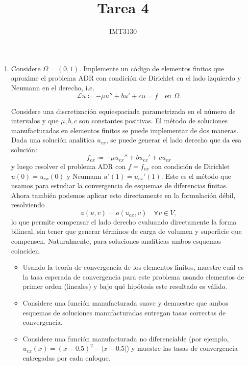 \documentclass{article}
\title{Tarea 4}
\author{}
\date{IMT3130}
\begin{document}
\maketitle

\instruccion

\begin{enumerate}
    \item Considere $\Omega = (0,1)$. Implemente un código de elementos finitos que aproxime el problema ADR con condición de Dirichlet en el lado izquierdo y Neumann en el derecho, i.e.
        $$ \mathcal L u \coloneqq -\mu u'' + b u' + c u = f \quad \text{en $\Omega$}.$$

        Considere una discretización equiespaciada parametrizada en el número de intervalos y que $\mu, b, c$ son constantes positivas. El método de soluciones manufacturadas en elementos finitos se puede implementar de dos maneras. Dada una solución analítica $u_{ex}$, se puede generar el lado derecho que da esa solución: 
            $$ f_{ex} \coloneqq -\mu u_{ex}'' + b u_{ex}' + c u_{ex} $$
            y luego resolver el problema ADR con $f = f_{ex}$ con condición de Dirichlet $u(0)=u_{ex}(0)$ y Neumann $u'(1) = u_{ex}'(1)$. Este es el método que usamos para estudiar la convergencia de esquemas de diferencias finitas. Ahora también podemos aplicar esto directamente en la formulación débil, resolviendo 
            $$ a(u,v) = a(u_{ex}, v) \quad \forall v \in V,$$
                lo que permite compensar el lado derecho evaluando directamente la forma bilineal, sin tener que generar términos de carga de volumen y superficie que compensen. Naturalmente, para soluciones analíticas ambos esquemas coinciden.

        \begin{itemize}
            \item{} Usando la teoría de convergencia de los elementos finitos, muestre cuál es la tasa esperada de convergencia para este problema usando elementos de primer orden (lineales) y bajo qué hipótesis este resultado es válido.
            \item{} Considere una función manufacturada suave y demuestre que ambos esquemas de soluciones manufacturadas entregan tasas correctas de convergencia. 
            \item{} Considere una función manufacturada no diferenciable (por ejemplo, $u_{ex}(x) = (x-0.5)^2 - |x-0.5|$) y muestre las tasas de convergencia entregadas por cada enfoque. 
        \end{itemize}


\end{enumerate}
\end{document}
